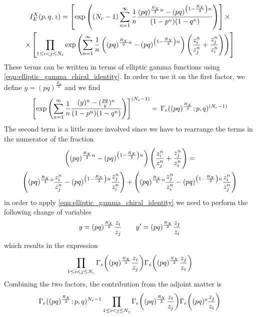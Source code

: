 \begin{appendices}
\begin{multline}
I_E^X(p,q,z) = 
\left[ \exp \left( (N_c -1) \sum_{n=1}^{\infty} {1 \over n}  \frac{ (pq)^{{\frac{R_X}{2}}n} - (pq)^{\left(1-{\frac{R_X}{2}} \right ) n}}{(1-p^n)(1-q^n)} \right) \right] \times
  \\
\times \left[  \prod_{ 1 \leq i < j \leq N_c} 
\exp \left(\sum_{n=1}^{\infty} {1 \over n}
\left ((pq)^{\frac{R_X}{2} n} - (pq)^{\left(1-\frac{R_X}{2} \right)n} \right) \left ( {z_i^n\over z_j^n} + { z_j^n \over z_i^n} \right) \right)
\right]
\end{multline}
These terms can be written in terms of elliptic gamma functions using \eqref{eqn:elliptic_gamma_chiral_identity}.
In order to use it on the first factor, we define $ y= (pq)^{\frac{R_X}{2}}$ and we find
\begin{equation}
\left[ \exp \left(  \sum_{n=1}^{\infty} {1 \over n}  \frac{ (y)^{n} - ({pq \over y})^{n}}{(1-p^n)(1-q^n)} \right)\right]^{(N_c-1)}
=
\,
\Gamma_e ( (pq)^{\frac{R_X}{2}}; p,q)^{(N_c-1)}
\end{equation}
The second term is a little more involved since we have to rearrange the terms in the numerator of the fraction
\begin{multline}
 \left ( \left (p q \right)^{\frac{R_X}{2} n} - (pq)^{\left( 1-\frac{R_X}{2} \right) n} \right) \left ( {z_i^n\over z_j^n} + { z_j^n \over z_i^n} \right)  = \\
 \left(  (pq)^{\frac{R_X}{2} n} {z_i^n\over z_j^n} - (pq)^{\left( 1-\frac{R_X}{2} \right) n}{ z_j^n \over z_i^n} \right)  + \left(  (pq)^{\frac{R_X}{2} n} { z_j^n \over z_i^n} - (pq)^{\left (1-\frac{R_X}{2} \right )n}{z_i^n\over z_j^n} \right)
\end{multline}
in order to apply \eqref{eqn:elliptic_gamma_chiral_identity} we need to perform the following change of variables 
\begin{equation}
	 y = (pq)^{\frac{R_X}{2}} {z_i \over z_j} \qquad y'= (pq)^{\frac{R_X}{2}} {z_j \over z_i}
\end{equation}
which results in the expression
\begin{equation}
\prod_{1\leq i<j\leq N_c} \Gamma_e \bigg( (pq)^\frac{R_X}{2} {z_i \over z_j} \bigg) \Gamma_e \bigg( (pq)^\frac{R_X}{2} {z_j \over z_i}\bigg)
\end{equation}
Combining the two factors, the contribution from the adjoint matter is 
\begin{equation}
\Gamma_e( (pq)^\frac{R_X}{2};p,q)^{N_c-1} \displaystyle \prod_{1\leq i<j\leq N_c} {\Gamma_e \bigg( (pq)^\frac{R_X}{2} {z_i \over z_j} \bigg) \Gamma_e \bigg( (pq)^s {z_j \over z_i}\bigg)}
\end{equation}


\end{appendices}
